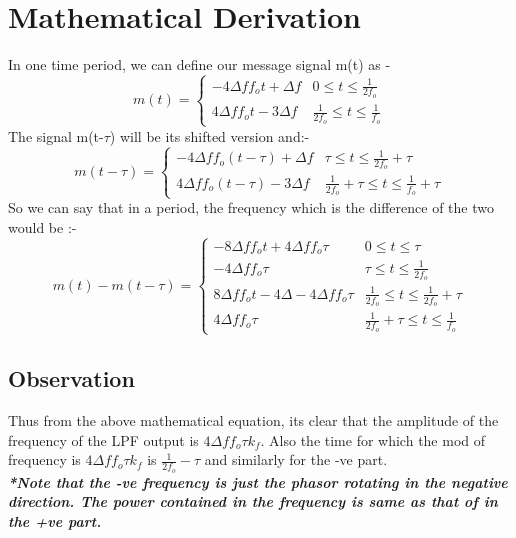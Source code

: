\documentclass[12pt]{article}
\begin{document}
\section{Mathematical Derivation}
\begin{flushleft}
In one time period, we can define our message signal m(t) as - \\
\[ m(t)=   \left\{
\begin{array}{ll}
      -4\Delta ff_o t+ \Delta f  & 0 \leq t\leq \frac{1}{2f_o} \\
       4\Delta ff_o t-3\Delta f  & \frac{1}{2f_o} \leq t \leq \frac{1}{f_o}
\end{array} 
\right. \]
The signal m(t-$\tau$) will be its shifted version and:- \\
\[ m(t-\tau)=   \left\{
\begin{array}{ll}
      -4\Delta ff_o (t-\tau)+ \Delta f  & \tau \leq t\leq \frac{1}{2f_o}+\tau \\
       4\Delta ff_o (t-\tau)-3\Delta f  & \frac{1}{2f_o}+ \tau \leq t \leq \frac{1}{f_o}+ \tau
\end{array} 
\right. \]
So we can say that in a period, the frequency which is the difference of the two would be :-
\[ m(t) - m(t-\tau)=   \left\{
\begin{array}{ll}
      -8\Delta ff_o t+ 4\Delta ff_o\tau &  0 \leq t\leq \tau \\
      -4\Delta ff_o\tau                 & \tau \leq t \leq \frac{1}{2f_o}\\
      8\Delta ff_o t -4\Delta -4\Delta ff_o \tau & \frac{1}{2f_o} \leq t \leq \frac{1}{2f_o} + \tau \\
      4\Delta ff_o\tau                                   & \frac{1}{2f_o} +\tau \leq t \leq \frac{1}{f_o}
\end{array} 
\right. \]
\subsection*{Observation}
\begin{flushleft}
Thus from the above mathematical equation, its clear that the amplitude of the frequency of the LPF output is $4\Delta ff_o\tau k_f$. Also the time for which the mod of frequency is $4\Delta ff_o\tau k_f$ is $\frac{1}{2f_o} - \tau$ and similarly for the -ve part. \\
\textit{\textbf{*Note that the -ve frequency is just the phasor rotating in the negative direction. The power contained in the frequency is same as that of in the +ve part.
}}\end{flushleft}
\end{flushleft} 
\end{document}
